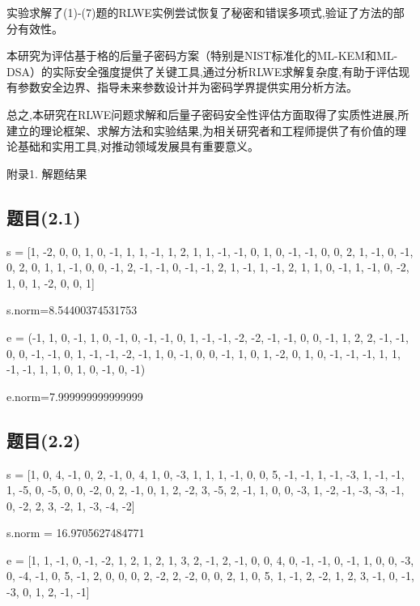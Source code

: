 \documentclass[12pt,a4paper]{article}
\numberwithin{equation}{section}
\begin{document}
实验求解了(1)-(7)题的RLWE实例尝试恢复了秘密和错误多项式,验证了方法的部分有效性。

本研究为评估基于格的后量子密码方案（特别是NIST标准化的ML-KEM和ML-DSA）的实际安全强度提供了关键工具,通过分析RLWE求解复杂度,有助于评估现有参数安全边界、指导未来参数设计并为密码学界提供实用分析方法。


总之,本研究在RLWE问题求解和后量子密码安全性评估方面取得了实质性进展,所建立的理论框架、求解方法和实验结果,为相关研究者和工程师提供了有价值的理论基础和实用工具,对推动领域发展具有重要意义。

\hspace*{\fill}

{\centering\heiti\fontsize{14pt}{21pt}\selectfont 附录1. 解题结果\par}
\vspace{1em}

\subsection{题目(2.1)}

s = [1, -2, 0, 0, 1, 0, -1, 1, 1, -1, 1, 2, 1, 1,
-1, -1, 0, 1, 0, -1, -1, 0, 0, 2, 1, -1, 0, -1, 0, 2, 0, 1,
1, -1, 0, 0, -1, 2, -1, -1, 0, -1, -1, 2, 1, -1, 1, -1, 2, 1, 1, 0,
-1, 1, -1, 0, -2, 1, 0, 1, -2, 0, 0, 1]

s.norm=8.54400374531753

e = (-1, 1, 0, -1, 1, 0, -1, 0, -1, -1, 0, 1, -1, -1, -2, -2, -1, -1, 0, 0, -1, 1, 2, 2, -1,
-1, 0, 0, -1, -1, 0, 1, -1, -1, -2, -1, 1, 0, -1, 0, 0, -1, 1, 0, 1, -2, 0, 1, 0, -1, -1,
-1, 1, 1, -1, -1, 1, 1, 0, 1, 0, -1, 0, -1)

e.norm=7.999999999999999

\subsection{题目(2.2)}

s = [1, 0, 4, -1, 0, 2, -1, 0, 4, 1, 0, -3, 1, 1, 1, -1, 0, 0, 5, -1, -1, 1, -1, -3, 1, -1, -1, 1, -5, 0, -5, 0, 0, -2, 0, 2, -1, 0, 1, 2, -2, 3, -5, 2, -1, 1, 0, 0, -3, 1, -2, -1, -3, -3, -1, 0, -2, 2, 3, -2, 1, -3, -4, -2]

s.norm = 16.9705627484771

e = [1, 1, -1, 0, -1, -2, 1, 2, 1, 2, 1, 3, 2, -1, 2, -1, 0, 0, 4, 0, -1, -1, 0, -1, 1, 0, 0, -3, 0, -4, -1, 0, 5, -1, 2, 0, 0, 0, 2, -2, 2, -2, 0, 0, 2, 1, 0, 5, 1, -1, 2, -2, 1, 2, 3, -1, 0, -1, -3, 0, 1, 2, -1, -1]
\end{document}
